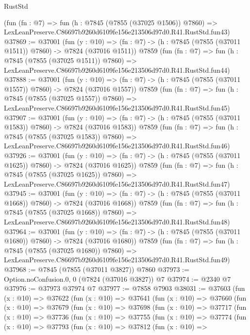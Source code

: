 \begin{lexlean}{RustStd}
\begin{coremodule}
    (fun (fn : @7) =>
    fun (h : @7845 (@7855 (@37025 @1506)) @7860) =>
    LexLeanPreserve.C86697b9260d6109fe156e213506d97d0.R41.RustStd.fun43)
@37869 := @37001
    (fun (y : @10) => (fn : @7) -> (h : @7845 (@7855 (@37011 @1511)) @7860) -> @7824 (@37016 @1511))
    @7859
    (fun (fn : @7) =>
    fun (h : @7845 (@7855 (@37025 @1511)) @7860) =>
    LexLeanPreserve.C86697b9260d6109fe156e213506d97d0.R41.RustStd.fun44)
@37888 := @37001
    (fun (y : @10) => (fn : @7) -> (h : @7845 (@7855 (@37011 @1557)) @7860) -> @7824 (@37016 @1557))
    @7859
    (fun (fn : @7) =>
    fun (h : @7845 (@7855 (@37025 @1557)) @7860) =>
    LexLeanPreserve.C86697b9260d6109fe156e213506d97d0.R41.RustStd.fun45)
@37907 := @37001
    (fun (y : @10) => (fn : @7) -> (h : @7845 (@7855 (@37011 @1583)) @7860) -> @7824 (@37016 @1583))
    @7859
    (fun (fn : @7) =>
    fun (h : @7845 (@7855 (@37025 @1583)) @7860) =>
    LexLeanPreserve.C86697b9260d6109fe156e213506d97d0.R41.RustStd.fun46)
@37926 := @37001
    (fun (y : @10) => (fn : @7) -> (h : @7845 (@7855 (@37011 @1625)) @7860) -> @7824 (@37016 @1625))
    @7859
    (fun (fn : @7) =>
    fun (h : @7845 (@7855 (@37025 @1625)) @7860) =>
    LexLeanPreserve.C86697b9260d6109fe156e213506d97d0.R41.RustStd.fun47)
@37945 := @37001
    (fun (y : @10) => (fn : @7) -> (h : @7845 (@7855 (@37011 @1668)) @7860) -> @7824 (@37016 @1668))
    @7859
    (fun (fn : @7) =>
    fun (h : @7845 (@7855 (@37025 @1668)) @7860) =>
    LexLeanPreserve.C86697b9260d6109fe156e213506d97d0.R41.RustStd.fun48)
@37964 := @37001
    (fun (y : @10) => (fn : @7) -> (h : @7845 (@7855 (@37011 @1680)) @7860) -> @7824 (@37016 @1680))
    @7859
    (fun (fn : @7) =>
    fun (h : @7845 (@7855 (@37025 @1680)) @7860) =>
    LexLeanPreserve.C86697b9260d6109fe156e213506d97d0.R41.RustStd.fun49)
@37968 := @7845 (@7855 (@37011 @3827)) @7860
@37973 := Option.noConfusion.{0, 0} (@7824 (@37016 @3827)) @7
@37974 := @2340 @7
@37976 := @37973 @37974 @7
@37977 := @7858 @7903
@38031 := @37603
    (fun (x : @10) =>
    @37622
      (fun (x : @10) =>
      @37641
        (fun (x : @10) =>
        @37660
          (fun (x : @10) =>
          @37679
            (fun (x : @10) =>
            @37698
              (fun (x : @10) =>
              @37717
                (fun (x : @10) =>
                @37736
                  (fun (x : @10) =>
                  @37755
                    (fun (x : @10) =>
                    @37774
                      (fun (x : @10) =>
                      @37793
                        (fun (x : @10) =>
                        @37812
                          (fun (x : @10) =>

\end{coremodule}
\end{lexlean}
